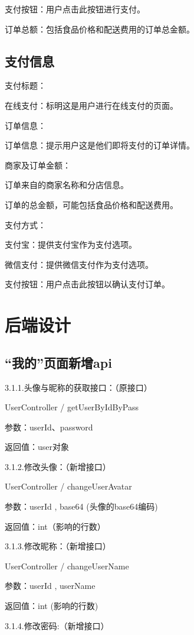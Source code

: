     支付按钮：用户点击此按钮进行支付。

    订单总额：包括食品价格和配送费用的订单总金额。

    \subsection{支付信息}

    支付标题：

    在线支付：标明这是用户进行在线支付的页面。

    订单信息：

    订单信息：提示用户这是他们即将支付的订单详情。

    商家及订单金额：

    订单来自的商家名称和分店信息。

    订单的总金额，可能包括食品价格和配送费用。

    支付方式：

    支付宝：提供支付宝作为支付选项。

    微信支付：提供微信支付作为支付选项。

    支付按钮：用户点击此按钮以确认支付订单。
    \section{后端设计}
    
    \subsection{``我的''页面新增api}

    3.1.1.头像与昵称的获取接口：（原接口）

    UserController / getUserByIdByPass

    参数：userId、password

    返回值：user对象

    3.1.2.修改头像：（新增接口）

    UserController / changeUserAvatar

    参数：userId , base64 (头像的base64编码)

    返回值：int（影响的行数）

    3.1.3.修改昵称：（新增接口）

    UserController / changeUserName

    参数：userId , userName

    返回值：int (影响的行数)

    3.1.4.修改密码:（新增接口）

